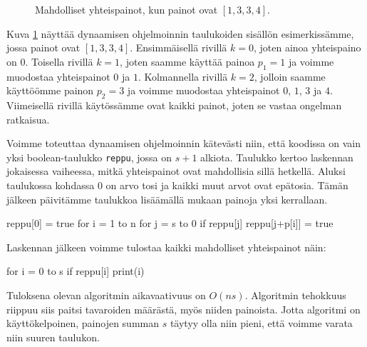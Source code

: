 \begin{figure}
\center
{}
\caption{Mahdolliset yhteispainot, kun painot ovat $[1,3,3,4]$.}
\label{fig:reppak}
\end{figure}

Kuva \ref{fig:reppak} näyttää dynaamisen ohjelmoinnin
taulukoiden sisällön esimerkissämme, jossa painot ovat $[1,3,3,4]$.
Ensimmäisellä rivillä $k=0$, joten ainoa yhteispaino on $0$.
Toisella rivillä $k=1$, joten saamme käyttää painoa $p_1=1$
ja voimme muodostaa yhteispainot $0$ ja $1$.
Kolmannella rivillä $k=2$, jolloin saamme käyttöömme painon $p_2=3$
ja voimme muodostaa yhteispainot $0$, $1$, $3$ ja $4$.
Viimeisellä rivillä käytössämme ovat kaikki painot,
joten se vastaa ongelman ratkaisua.

Voimme toteuttaa dynaamisen ohjelmoinnin kätevästi niin,
että koodissa on vain yksi boolean-taulukko \texttt{reppu},
jossa on $s+1$ alkiota.
Taulukko kertoo laskennan jokaisessa vaiheessa,
mitkä yhteispainot ovat mahdollisia sillä hetkellä.
Aluksi taulukossa kohdassa $0$ on arvo tosi ja
kaikki muut arvot ovat epätosia.
Tämän jälkeen päivitämme taulukkoa lisäämällä mukaan
painoja yksi kerrallaan.

\begin{code}
reppu[0] = true
for i = 1 to n
    for j = s to 0
        if reppu[j]
            reppu[j+p[i]] = true
\end{code}

Laskennan jälkeen voimme tulostaa kaikki
mahdolliset yhteispainot näin:

\begin{code}
for i = 0 to s
    if reppu[i]
        print(i)
\end{code}

Tuloksena olevan algoritmin aikavaativuus on $O(ns)$.
Algoritmin tehokkuus riippuu siis paitsi tavaroiden määrästä,
myös niiden painoista.
Jotta algoritmi on käyttökelpoinen, painojen summan $s$
täytyy olla niin pieni, että voimme varata niin suuren taulukon.

